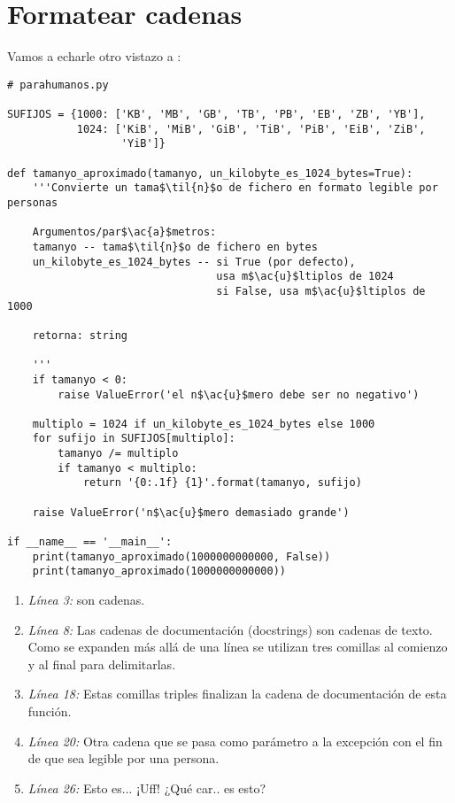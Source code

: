 \section{Formatear cadenas}


Vamos a echarle otro vistazo a :

\noindent\begin{minipage}{\textwidth}
\begin{lstlisting}[mathescape=True]
# parahumanos.py

SUFIJOS = {1000: ['KB', 'MB', 'GB', 'TB', 'PB', 'EB', 'ZB', 'YB'],
           1024: ['KiB', 'MiB', 'GiB', 'TiB', 'PiB', 'EiB', 'ZiB', 
                  'YiB']}

def tamanyo_aproximado(tamanyo, un_kilobyte_es_1024_bytes=True):
    '''Convierte un tama$\til{n}$o de fichero en formato legible por personas

    Argumentos/par$\ac{a}$metros:
    tamanyo -- tama$\til{n}$o de fichero en bytes
    un_kilobyte_es_1024_bytes -- si True (por defecto), 
                                 usa m$\ac{u}$ltiplos de 1024
                                 si False, usa m$\ac{u}$ltiplos de 1000

    retorna: string

    '''
    if tamanyo < 0:
        raise ValueError('el n$\ac{u}$mero debe ser no negativo')

    multiplo = 1024 if un_kilobyte_es_1024_bytes else 1000
    for sufijo in SUFIJOS[multiplo]:
        tamanyo /= multiplo
        if tamanyo < multiplo:
            return '{0:.1f} {1}'.format(tamanyo, sufijo)

    raise ValueError('n$\ac{u}$mero demasiado grande')

if __name__ == '__main__':
    print(tamanyo_aproximado(1000000000000, False))
    print(tamanyo_aproximado(1000000000000))

\end{lstlisting}
\end{minipage}

\begin{enumerate}

\item \emph{Línea 3:}  son cadenas.

\item \emph{Línea 8:} Las cadenas de documentación (docstrings) son cadenas de texto. Como se expanden más allá de una línea se utilizan tres comillas al comienzo y al final para delimitarlas.

\item \emph{Línea 18:} Estas comillas triples finalizan la cadena de documentación de esta función.

\item \emph{Línea 20:} Otra cadena que se pasa como parámetro a la excepción con el fin de que sea legible por una persona.

\item \emph{Línea 26:} Esto es... ¡Uff! ¿Qué car.. es esto?

\end{enumerate}

